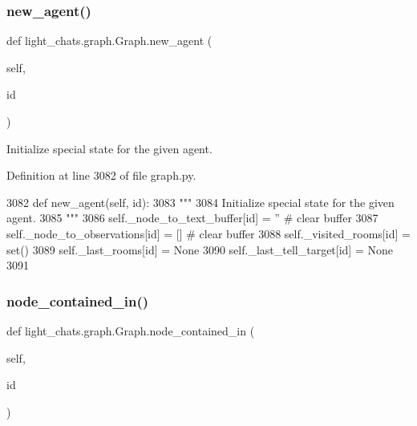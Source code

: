 \subsubsection{\texorpdfstring{new\+\_\+agent()}{new\_agent()}}
{\footnotesize\ttfamily def light\+\_\+chats.\+graph.\+Graph.\+new\+\_\+agent (\begin{DoxyParamCaption}\item[{}]{self,  }\item[{}]{id }\end{DoxyParamCaption})}

\begin{DoxyVerb}Initialize special state for the given agent.
\end{DoxyVerb}
 

Definition at line 3082 of file graph.\+py.


\begin{DoxyCode}
3082     \textcolor{keyword}{def }new\_agent(self, id):
3083         \textcolor{stringliteral}{"""}
3084 \textcolor{stringliteral}{        Initialize special state for the given agent.}
3085 \textcolor{stringliteral}{        """}
3086         self.\_node\_to\_text\_buffer[id] = \textcolor{stringliteral}{''}  \textcolor{comment}{# clear buffer}
3087         self.\_node\_to\_observations[id] = []  \textcolor{comment}{# clear buffer}
3088         self.\_visited\_rooms[id] = set()
3089         self.\_last\_rooms[id] = \textcolor{keywordtype}{None}
3090         self.\_last\_tell\_target[id] = \textcolor{keywordtype}{None}
3091 
\end{DoxyCode}
\mbox{\label{classlight__chats_1_1graph_1_1Graph_a6afbdb89ba9db7f792506d9171f9e287}} 
\subsubsection{\texorpdfstring{node\+\_\+contained\+\_\+in()}{node\_contained\_in()}}
{\footnotesize\ttfamily def light\+\_\+chats.\+graph.\+Graph.\+node\+\_\+contained\+\_\+in (\begin{DoxyParamCaption}\item[{}]{self,  }\item[{}]{id }\end{DoxyParamCaption})}



